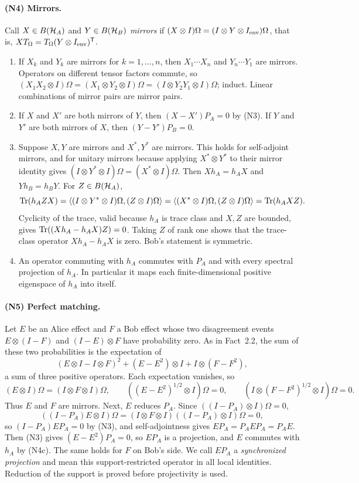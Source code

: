 \paragraph{(N4) Mirrors.}
Call $X\in B(\mathcal H_A)$ and $Y\in B(\mathcal H_B)$ \emph{mirrors} if $(X\otimes I)\Omega=(I\otimes Y\otimes I_{\rm env})\Omega$, that is, $XT_\Omega=T_\Omega(Y\otimes I_{\rm env})^{\mathsf T}$.
\begin{enumerate}[label=(\alph*)]
\item If $X_k$ and $Y_k$ are mirrors for $k=1,\ldots,n$, then $X_1\cdots X_n$ and $Y_n\cdots Y_1$ are mirrors. Operators on different tensor factors commute, so $(X_1X_2\otimes I)\Omega=(X_1\otimes Y_2\otimes I)\Omega=(I\otimes Y_2Y_1\otimes I)\Omega$; induct. Linear combinations of mirror pairs are mirror pairs.
\item If $X$ and $X'$ are both mirrors of $Y$, then $(X-X')P_A=0$ by (N3). If $Y$ and $Y'$ are both mirrors of $X$, then $(Y-Y')P_B=0$.
\item Suppose $X,Y$ are mirrors and $X^*,Y^*$ are mirrors. This holds for self-adjoint mirrors, and for unitary mirrors because applying $X^*\otimes Y^*$ to their mirror identity gives $(I\otimes Y^*\otimes I)\Omega=(X^*\otimes I)\Omega$. Then $Xh_A=h_AX$ and $Yh_B=h_BY$. For $Z\in B(\mathcal H_A)$,
\[
 \operatorname{Tr}(h_AZX)=\langle(I\otimes Y^*\otimes I)\Omega,(Z\otimes I)\Omega\rangle
 =\langle(X^*\otimes I)\Omega,(Z\otimes I)\Omega\rangle=\operatorname{Tr}(h_AXZ).
\]
Cyclicity of the trace, valid because $h_A$ is trace class and $X,Z$ are bounded, gives $\operatorname{Tr}((Xh_A-h_AX)Z)=0$. Taking $Z$ of rank one shows that the trace-class operator $Xh_A-h_AX$ is zero. Bob's statement is symmetric.
\item An operator commuting with $h_A$ commutes with $P_A$ and with every spectral projection of $h_A$. In particular it maps each finite-dimensional positive eigenspace of $h_A$ into itself.
\end{enumerate}

\paragraph{(N5) Perfect matching.}
Let $E$ be an Alice effect and $F$ a Bob effect whose two disagreement events $E\otimes(I-F)$ and $(I-E)\otimes F$ have probability zero. As in Fact~2.2, the sum of these two probabilities is the expectation of
\[
 (E\otimes I-I\otimes F)^2+(E-E^2)\otimes I+I\otimes(F-F^2),
\]
a sum of three positive operators. Each expectation vanishes, so
\[
 (E\otimes I)\Omega=(I\otimes F\otimes I)\Omega,\qquad
 ((E-E^2)^{1/2}\otimes I)\Omega=0,\qquad
 (I\otimes(F-F^2)^{1/2}\otimes I)\Omega=0 .
\]
Thus $E$ and $F$ are mirrors. Next, $E$ reduces $P_A$. Since $((I-P_A)\otimes I)\Omega=0$,
\[
 ((I-P_A)E\otimes I)\Omega=(I\otimes F\otimes I)((I-P_A)\otimes I)\Omega=0,
\]
so $(I-P_A)EP_A=0$ by (N3), and self-adjointness gives $EP_A=P_AEP_A=P_AE$. Then (N3) gives $(E-E^2)P_A=0$, so $EP_A$ is a projection, and $E$ commutes with $h_A$ by (N4c). The same holds for $F$ on Bob's side. We call $EP_A$ a \emph{synchronized projection} and mean this support-restricted operator in all local identities. Reduction of the support is proved before projectivity is used.

